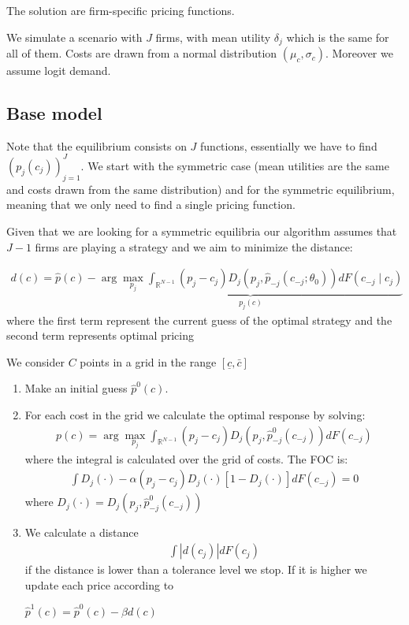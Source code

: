 \documentclass[12pt]{article}
\begin{document}
The solution are firm-specific pricing functions. 

\medskip

We simulate a scenario with $J$ firms, with mean utility $\delta_j$ which is the same for all of them. Costs are drawn from a normal distribution $(\mu_c, \sigma_c)$. %
Moreover we assume logit demand. 
\subsection{Base model}
Note that the equilibrium consists on $J$ functions, essentially we have to find $(p_j(c_j))_{j=1}^J$. We start with the symmetric case (mean utilities are the same and costs drawn from the same distribution) and for the symmetric equilibrium, meaning that we only need to find a single pricing function. 

Given that we are looking for a symmetric equilibria our algorithm assumes that $J-1$ firms are playing a strategy  and we aim to minimize the distance: 


\begin{align}
    d(c) = \hat{p}(c) -\underbrace{\arg \max_{p_j} \int_{\mathbb{R}^{N-1}}^{} (p_j - c_j) D_j(p_j, \hat{p}_{-j}(c_{-j}; \theta_0)) dF(c_{-j} \mid c_j)}_{p_j(c)}
\end{align} 
where the first term represent the current guess of the optimal strategy and the  second term represents optimal pricing 


We consider $C$ points in a grid in the range $[\underline{c}, \bar{c}] $

\begin{enumerate}
    \item Make an initial guess $\hat{p}^0(c)$. 
    \item For each cost in the grid we calculate the optimal response by solving: 
    \begin{align}
        p(c) = \arg \max_{p_j} \int_{\mathbb{R}^{N-1}}^{} (p_j - c_j) D_j(p_j, \hat{p}^0_{-j}(c_{-j})) dF(c_{-j})
    \end{align}  
    where the integral is calculated over the grid of costs.
    The FOC is:  
    \begin{align}
        \int D_j(\cdot) -\alpha  (p_j - c_j)  D_j(\cdot) [1-D_j(\cdot)] dF(c_{-j}) = 0 
    \end{align} 
    where $D_j(\cdot) = D_j(p_j, \hat{p}^0_{-j}(c_{-j}))$
    

    
    \item We calculate a distance 
    \begin{align}
        \int | d(c_j) | dF(c_j)
    \end{align}
    if the distance is lower than a tolerance level we stop. If it is higher we update each price according to 

    $\hat{p}^1(c) = \hat{p}^0(c) - \beta d(c)$
    
\end{enumerate}
\end{document}

